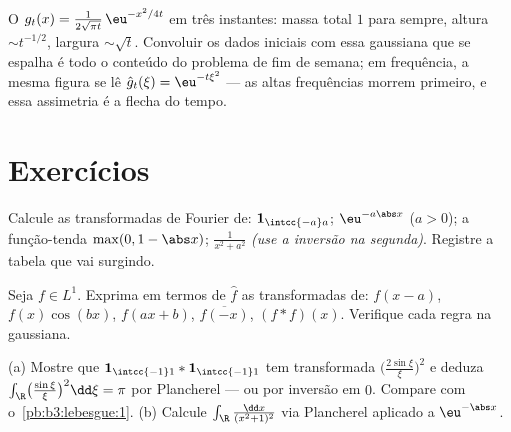 \begin{omfigure}

{\small O  $g_t(x) =
\frac1{2\sqrt{\pi t}}\,\eu^{-x^2/4t}$ em três instantes: massa total $1$
para sempre, altura $\sim t^{-1/2}$, largura $\sim
\sqrt t$. Convoluir os dados iniciais
com essa gaussiana que se espalha é todo o conteúdo do problema de fim
de semana; em frequência, a mesma figura se lê $\hat g_t(\xi) = \eu^{-t\xi^2}$ --- as altas
frequências morrem primeiro, e essa assimetria é a flecha do tempo.}
\end{omfigure}

\section{Exercícios}

\begin{exercise}[$\star$]\label{exo:b3:fouriertransform:1}
Calcule as transformadas de Fourier de: $\mathbf 1_{\intcc{-a}a}$; $\eu^{-a\abs x}$ ($a > 0$); a
função-tenda $\max(0, 1 -
\abs x)$; $\frac1{x^2 + a^2}$ \emph{(use a inversão na segunda)}. Registre a
tabela que vai surgindo.
\end{exercise}

\begin{exercise}[$\star$]\label{exo:b3:fouriertransform:2}
Seja $f \in L^1$. Exprima em termos de $\hat f$ as transformadas de:
$f(x - a)$, $f(x)\cos(bx)$, $f(ax + b)$, $\overline{f(-x)}$, $(f * f)(x)$. Verifique cada regra na gaussiana.
\end{exercise}

\begin{exercise}[$\star\star$]\label{exo:b3:fouriertransform:3}
(a) Mostre que $\mathbf 1_{\intcc{-1}1} * \mathbf
1_{\intcc{-1}1}$ tem transformada $\bigl(\frac{2\sin\xi}\xi
\bigr)^2$ e deduza $\int_\R\bigl(\frac{\sin\xi}\xi\bigr)^2\dd\xi = \pi$ por
Plancherel --- ou por inversão em $0$. Compare com
o~\cref{pb:b3:lebesgue:1}.
(b) Calcule $\int_\R\frac{\dd x}{(x^2+1)^2}$ via Plancherel aplicado a $\eu^{-\abs x}$.
\end{exercise}

